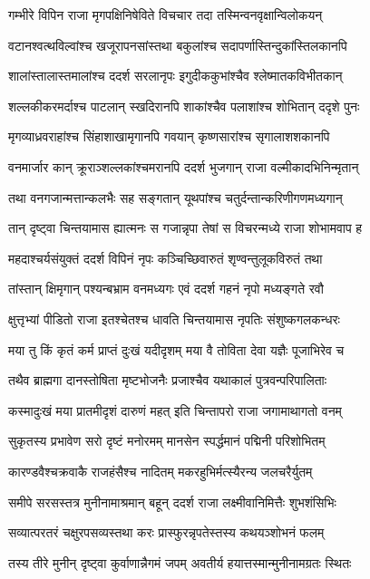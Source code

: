 \twolineshloka
{गम्भीरे विपिन राजा मृगपक्षिनिषेविते}
{विचचार तदा तस्मिन्वनवृक्षान्विलोकयन्} %

\twolineshloka
{वटानश्वत्थविल्वांश्च खजूरापनसांस्तथा}
{बकुलांश्च सदापर्णास्तिन्दुकांस्तिलकानपि} %

\twolineshloka
{शालांस्तालास्तमालांश्च ददर्श सरलानृपः}
{इगुदीककुभांश्चैव श्लेष्मातकविभीतकान्} %

\twolineshloka
{शल्लकीकरमर्दाश्च पाटलान् स्खदिरानपि}
{शाकांश्चैव पलाशांश्च शोभितान् ददृशे पुनः} %

\twolineshloka
{मृगव्याध्रवराहांश्च सिंहाशाखामृगानपि}
{गवयान् कृष्णसारांश्च सृगालाशशकानपि} %

\twolineshloka
{वनमार्जार कान् क्रूराञ्शल्लकांश्चमरानपि}
{ददर्श भुजगान् राजा वल्मीकादभिनिन्मृतान्} %

\twolineshloka
{तथा वनगजान्मत्तान्कलभैः सह सङ्गतान्}
{यूथपांश्च चतुर्दन्तान्करिणीगणमध्यगान्} %

\twolineshloka
{तान् दृष्ट्वा चिन्तयामास ह्यात्मनः स गजान्नृपा}
{तेषां स विचरन्मध्ये राजा शोभामवाप ह} %

\twolineshloka
{महदाश्चर्यसंयुक्तं ददर्श विपिनं नृपः}
{कञ्चिच्छिवारुतं शृण्वन्तुलूकविरुतं तथा} %

\twolineshloka
{तांस्तान् क्षिमृगान् पश्यन्बभ्राम वनमध्यगः}
{एवं ददर्श गहनं नृपो मध्यङ्गते रवौ} %

\twolineshloka
{क्षुत्तृभ्यां पीडितो राजा इतश्चेतश्च धावति}
{चिन्तयामास नृपतिः संशुष्कगलकन्धरः} %

\twolineshloka
{मया तु किं कृतं कर्म प्राप्तं दुःखं यदीदृशम्}
{मया वै तोविता देवा यज्ञैः पूजाभिरेव च} %

\twolineshloka
{तथैव ब्राह्मगा दानस्तोषिता मृष्टभोजनैः}
{प्रजाश्चैव यथाकालं पुत्रवन्परिपालिताः} %

\twolineshloka
{कस्मादुःखं मया प्रातमीदृशं दारुणं महत्}
{इति चिन्तापरो राजा जगामाथागतो वनम्} %

\twolineshloka
{सुकृतस्य प्रभावेण सरो दृष्टं मनोरमम्}
{मानसेन स्पर्द्धमानं पद्मिनी परिशोभितम्} %

\twolineshloka
{कारण्डवैश्चक्रवाकै राजहंसैश्च नादितम्}
{मकरहुभिर्मत्स्यैरन्य जलचरैर्युतम्} %

\twolineshloka
{समीपे सरसस्तत्र मुनीनामाश्रमान् बहून्}
{ददर्श राजा लक्ष्मीवानिमित्तैः शुभशंसिभिः} %

\twolineshloka
{सव्यात्परतरं चक्षुरपसव्यस्तथा करः}
{प्रास्फुरन्नृपतेस्तस्य कथयञ्शोभनं फलम्} %

\twolineshloka
{तस्य तीरे मुनीन् दृष्ट्वा कुर्वाणान्नैगमं जपम्}
{अवतीर्य हयात्तस्मान्मुनीनामग्रतः स्थितः} %

